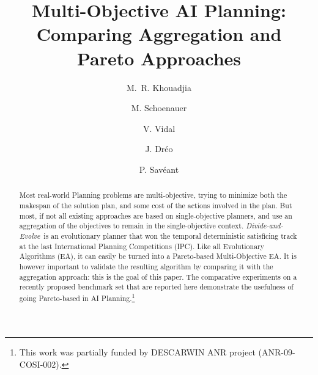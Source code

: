 \documentclass{llncs}
\def\dae{{\em Divide-and-Evolve}}
\begin{document}
\mainmatter              %
%
\title{Multi-Objective AI Planning: Comparing Aggregation and Pareto Approaches}
%
%
 \author{M.~R. Khouadjia  \and M. Schoenauer\and
 V. Vidal  \and J. Dr\'eo \and P. Sav\'eant}

%
%
%

\maketitle              %
\renewcommand{\thefootnote}{}
\begin{abstract}
Most real-world Planning problems are multi-objective, trying to minimize both the makespan of the solution plan, and some cost of the actions involved in the plan. But most, if not all existing approaches are based on single-objective planners, and use an aggregation of the objectives to remain in the single-objective context. \dae\ is an evolutionary planner that won the temporal deterministic satisficing track at the last International Planning Competitions (IPC). Like all Evolutionary Algorithms (EA), it can easily be turned into a Pareto-based Multi-Objective EA. It is however important to  validate the resulting algorithm by comparing it with the aggregation approach: this is the goal of this paper. The comparative experiments on a recently proposed benchmark set that are reported here demonstrate the usefulness of going Pareto-based in AI Planning.\footnote{This work was partially funded by DESCARWIN ANR project (ANR-09-COSI-002).}
\end{abstract}
%
\end{document}
